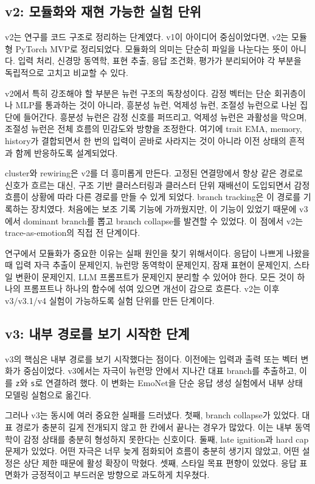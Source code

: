 \documentclass[11pt,a4paper]{article}
\newcommand{\eng}[1]{\texttt{#1}}
\begin{document}
\subsection{v2: 모듈화와 재현 가능한 실험 단위}

v2는 연구를 코드 구조로 정리하는 단계였다. v1이 아이디어 중심이었다면, v2는 모듈형 PyTorch MVP로 정리되었다. 모듈화의 의미는 단순히 파일을 나눈다는 뜻이 아니다. 입력 처리, 신경망 동역학, 표현 추출, 응답 조건화, 평가가 분리되어야 각 부분을 독립적으로 고치고 비교할 수 있다.

v2에서 특히 강조해야 할 부분은 뉴런 구조의 독창성이다. 감정 벡터는 단순 회귀층이나 MLP를 통과하는 것이 아니라, 흥분성 뉴런, 억제성 뉴런, 조절성 뉴런으로 나뉜 집단에 들어간다. 흥분성 뉴런은 감정 신호를 퍼뜨리고, 억제성 뉴런은 과활성을 막으며, 조절성 뉴런은 전체 흐름의 민감도와 방향을 조정한다. 여기에 trait EMA, memory, history가 결합되면서 한 번의 입력이 곧바로 사라지는 것이 아니라 이전 상태의 흔적과 함께 반응하도록 설계되었다.

cluster와 rewiring은 v2를 더 흥미롭게 만든다. 고정된 연결망에서 항상 같은 경로로 신호가 흐르는 대신, 구조 기반 클러스터링과 클러스터 단위 재배선이 도입되면서 감정 흐름이 상황에 따라 다른 경로를 만들 수 있게 되었다. branch tracking은 이 경로를 기록하는 장치였다. 처음에는 보조 기록 기능에 가까웠지만, 이 기능이 있었기 때문에 v3에서 dominant branch를 뽑고 branch collapse를 발견할 수 있었다. 이 점에서 v2는 trace-as-emotion의 직접 전 단계이다.

연구에서 모듈화가 중요한 이유는 실패 원인을 찾기 위해서이다. 응답이 나쁘게 나왔을 때 입력 자극 추출이 문제인지, 뉴런망 동역학이 문제인지, 잠재 표현이 문제인지, 스타일 변환이 문제인지, LLM 프롬프트가 문제인지 분리할 수 있어야 한다. 모든 것이 하나의 프롬프트나 하나의 함수에 섞여 있으면 개선이 감으로 흐른다. v2는 이후 v3/v3.1/v4 실험이 가능하도록 실험 단위를 만든 단계이다.

\subsection{v3: 내부 경로를 보기 시작한 단계}

v3의 핵심은 내부 경로를 보기 시작했다는 점이다. 이전에는 입력과 출력 또는 벡터 변화가 중심이었다. v3에서는 자극이 뉴런망 안에서 지나간 대표 branch를 추출하고, 이를 \eng{z}와 \eng{s}로 연결하려 했다. 이 변화는 EmoNet을 단순 응답 생성 실험에서 내부 상태 모델링 실험으로 옮긴다.

그러나 v3는 동시에 여러 중요한 실패를 드러냈다. 첫째, branch collapse가 있었다. 대표 경로가 충분히 길게 전개되지 않고 한 칸에서 끝나는 경우가 많았다. 이는 내부 동역학이 감정 상태를 충분히 형성하지 못한다는 신호이다. 둘째, late ignition과 hard cap 문제가 있었다. 어떤 자극은 너무 늦게 점화되어 흐름이 충분히 생기지 않았고, 어떤 설정은 상단 제한 때문에 활성 확장이 막혔다. 셋째, 스타일 목표 편향이 있었다. 응답 표면화가 긍정적이고 부드러운 방향으로 과도하게 치우쳤다.
\end{document}
